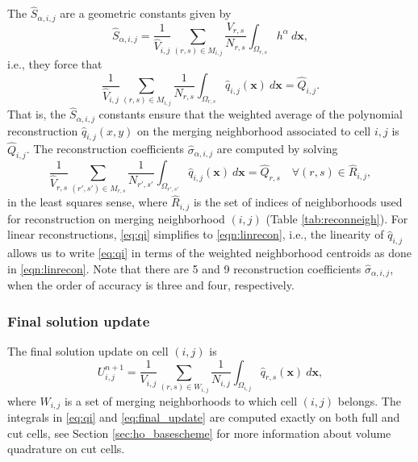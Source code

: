 The $ \widehat S_{\alpha, i,j}$ are a geometric constants given by
$$
\widehat S_{\alpha, i,j} = \frac{1}{ \widehat{V}_{i,j}} \sum_{(r,s) \in M_{i,j} }\frac{V_{r,s}}{N_{r,s}} \int_{\Omega_{r,s}} h^{\alpha}~d\mathbf{x},
$$
i.e., they force that 
\begin{equation} \label{eq:average}
\frac{1}{ \widehat{V}_{i,j}} \sum_{(r,s) \in M_{i,j} }\frac{1}{N_{r,s}} \int_{\Omega_{r,s}} \widehat{q}_{i,j}(\mathbf{x}) ~d\mathbf{x} = \widehat{Q}_{i,j}.
\end{equation}
That is, the $\widehat S_{\alpha, i,j}$ constants ensure that the weighted average of the polynomial reconstruction $\widehat q_{i,j}(x,y)$ on the merging neighborhood associated to cell $i,j$ is $\widehat{Q}_{i,j}$.
The reconstruction coefficients $\widehat \sigma_{\alpha,i,j}$ are computed by solving
\begin{equation}\label{eq:qi}
\frac{1}{\widehat{V}_{r,s}}\sum_{(r',s') \in M_{r,s}}\frac{1}{N_{r',s'}}\int_{\Omega_{r',s'}} \widehat q_{i,j}(\mathbf{x})~d\mathbf{x} = \widehat Q_{r,s} \quad \forall (r,s) \in \widehat R_{i,j},
\end{equation}
in the least squares sense, where $\widehat R_{i,j}$ is the set of indices of neighborhoods used for reconstruction on merging neighborhood $(i,j)$ (Table \ref{tab:reconneigh}).  For linear reconstructions, \eqref{eq:qi} simplifies to \eqref{eqn:linrecon}, i.e., the linearity of $\widehat{q}_{i,j}$ allows us to write \eqref{eq:qi} in terms of the weighted neighborhood centroids as done in \eqref{eqn:linrecon}.
Note that there are 5 and 9 reconstruction coefficients $\widehat{\sigma}_{\alpha, i,j}$, when the order of accuracy is three and four, respectively.

\subsubsection*{Final solution update}
The final solution update on cell $(i,j)$ is
	\begin{equation}\label{eq:final_update}
	U^{n+1}_{i,j} =  \frac{1}{V_{i,j}}\sum_{(r,s) \in W_{i,j}}\frac{1}{N_{i,j}}\int_{\Omega_{i,j}} \widehat q_{r,s}(\mathbf{x})~d\mathbf{x} ,
	\end{equation}
	where $W_{i,j}$ is a set of merging neighborhoods to which cell $(i,j)$ belongs.
The integrals in \eqref{eq:qi} and \eqref{eq:final_update} are computed exactly on both full and cut cells, see Section \ref{sec:ho_basescheme} for more information about volume quadrature on cut cells.  

